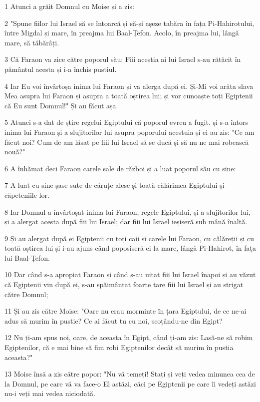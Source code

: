 \par 1 Atunci a grăit Domnul cu Moise și a zis:
\par 2 "Spune fiilor lui Israel să se întoarcă și să-și așeze tabăra în fața Pi-Hahirotului, între Migdal și mare, în preajma lui Baal-Țefon. Acolo, în preajma lui, lângă mare, să tăbărâți.
\par 3 Că Faraon va zice către poporul său: Fiii aceștia ai lui Israel s-au rătăcit în pământul acesta și i-a închis pustiul.
\par 4 Iar Eu voi învârtoșa inima lui Faraon și va alerga după ei. Și-Mi voi arăta slava Mea asupra lui Faraon și asupra a toată oștirea lui; și vor cunoaște toți Egiptenii că Eu sunt Domnul!" Și au făcut așa.
\par 5 Atunci s-a dat de știre regelui Egiptului că poporul evreu a fugit. și s-a întors inima lui Faraon și a slujitorilor lui asupra poporului acestuia și ei au zis: "Ce am făcut noi? Cum de am lăsat pe fiii lui Israel să se ducă și să nu ne mai robească nouă?"
\par 6 A înhămat deci Faraon carele sale de război și a luat poporul său cu sine:
\par 7 A luat cu sine șase sute de căruțe alese și toată călărimea Egiptului și căpeteniile lor.
\par 8 Iar Domnul a învârtoșat inima lui Faraon, regele Egiptului, și a slujitorilor lui, și a alergat acesta după fiii lui Israel; dar fiii lui Israel ieșiseră sub mână înaltă.
\par 9 Și au alergat după ei Egiptenii cu toți caii și carele lui Faraon, cu călăreții și cu toată oștirea lui și i-au ajuns când poposiseră ei la mare, lângă Pi-Hahirot, în fața lui Baal-Țefon.
\par 10 Dar când s-a apropiat Faraon și când s-au uitat fiii lui Israel înapoi și au văzut că Egiptenii vin după ei, s-au spăimântat foarte tare fiii lui Israel și au strigat către Domnul;
\par 11 Și au zis către Moise: "Oare nu erau morminte în țara Egiptului, de ce ne-ai adus să murim în pustie? Ce ai făcut tu cu noi, scoțându-ne din Egipt?
\par 12 Nu ți-am spus noi, oare, de aceasta în Egipt, când ți-am zis: Lasă-ne să robim Egiptenilor, că e mai bine să fim robi Egiptenilor decât să murim în pustia aceasta?"
\par 13 Moise însă a zis către popor: "Nu vă temeți! Stați și veți vedea minunea cea de la Domnul, pe care vă va face-o El astăzi, căci pe Egiptenii pe care îi vedeți astăzi nu-i veți mai vedea niciodată.
